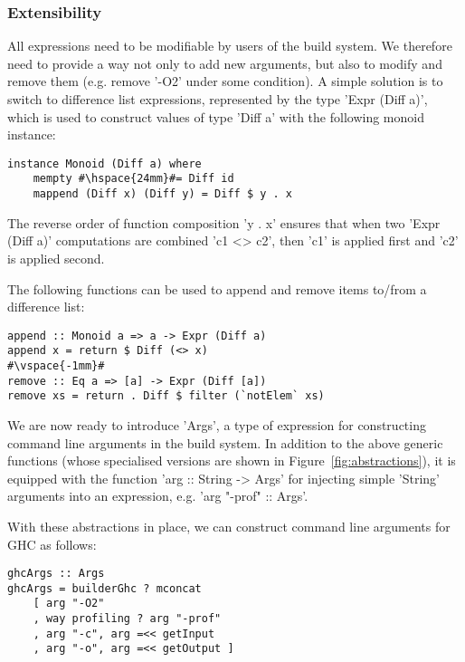 \subsubsection{Extensibility}

All expressions need to be modifiable by users of the build system. We therefore
need to provide a way not only to add new arguments, but also
to modify and remove them (e.g. remove \lst'-O2' under some condition). A
simple solution is to switch to difference list expressions, represented by the type \lst'Expr (Diff a)', which is used to
construct values of type \lst'Diff a' with the following monoid instance:

\begin{lstlisting}
instance Monoid (Diff a) where
    mempty #\hspace{24mm}#= Diff id
    mappend (Diff x) (Diff y) = Diff $ y . x
\end{lstlisting}

\noindent The reverse order of function composition \lst'y . x' ensures that
when two \lst'Expr (Diff a)' computations are combined \lst'c1 <> c2', then
\lst'c1' is applied first and \lst'c2' is applied second.

The following functions can be used to append and remove items to/from a
difference list:

\begin{lstlisting}
append :: Monoid a => a -> Expr (Diff a)
append x = return $ Diff (<> x)
#\vspace{-1mm}#
remove :: Eq a => [a] -> Expr (Diff [a])
remove xs = return . Diff $ filter (`notElem` xs)
\end{lstlisting}


We are now ready to introduce \lst'Args', a type of expression for
constructing command line arguments in the build system. In addition to the
above generic functions (whose specialised versions are shown in
Figure~\ref{fig:abstractions}), it is equipped with the function
\lst'arg :: String -> Args' for injecting simple \lst'String' arguments into
an expression, e.g. \lst'arg "-prof" :: Args'.

With these abstractions in place, we can construct command
line arguments for GHC as follows:

\begin{lstlisting}
ghcArgs :: Args
ghcArgs = builderGhc ? mconcat
    [ arg "-O2"
    , way profiling ? arg "-prof"
    , arg "-c", arg =<< getInput
    , arg "-o", arg =<< getOutput ]
\end{lstlisting}

